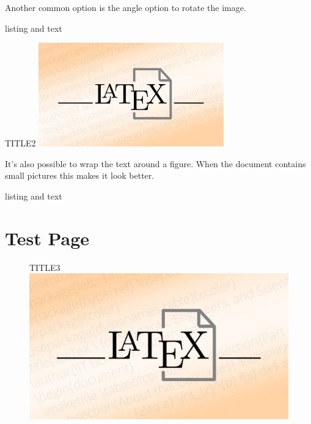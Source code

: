 \documentclass[]{myHOWTO-V001}
\begin{document}
Another common option is the angle option to rotate the image.

\begin{myTEXEXdoclst}{}{listing and text}
\centering
\begin{myFIGlst}{TITLE2}{}
	\includegraphics[width=80mm, angle=20]{LaTeX.jpg}
\end{myFIGlst}
\end{myTEXEXdoclst}

\newpage

It's also possible to wrap the text around a figure. When the document contains small pictures this makes it look better. \cite{Overleaf2023}

\begin{myTEXEXdoclst}{}{listing and text}
\vspace{5mm}
\section*{Test Page}
\begin{figure}
	\centering
	\begin{myFIGlst}{TITLE3}{}
		\includegraphics[scale=0.1]{LaTeX.jpg}
	\end{myFIGlst}
\end{figure}
\lipsum[4] \lipsum[4]
\end{myTEXEXdoclst}
\end{document}
